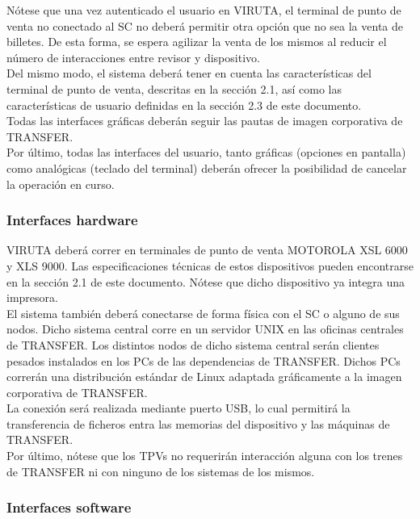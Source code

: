 Nótese que una vez autenticado el usuario en VIRUTA, el terminal de punto de venta no conectado al SC no deberá permitir otra opción que no sea la venta de billetes. De esta forma, se espera agilizar la venta de los mismos al reducir el número de interacciones entre revisor y dispositivo.\\

Del mismo modo, el sistema deberá tener en cuenta las características del terminal de punto de venta, descritas en la sección 2.1, así como las características de usuario definidas en la sección 2.3 de este documento.\\

Todas las interfaces gráficas deberán seguir las pautas de imagen corporativa de TRANSFER.\\

Por último, todas las interfaces del usuario, tanto gráficas (opciones en pantalla) como analógicas (teclado del terminal) deberán ofrecer la posibilidad de cancelar la operación en curso.\\

\subsubsection{Interfaces hardware}

VIRUTA deberá correr en terminales de punto de venta MOTOROLA XSL 6000 y XLS 9000. Las especificaciones técnicas de estos dispositivos pueden encontrarse en la sección 2.1 de este documento. Nótese que dicho dispositivo ya integra una impresora.\\

El sistema también deberá conectarse de forma física con el SC o alguno de sus nodos. Dicho sistema central corre en un servidor UNIX en las oficinas centrales de TRANSFER. Los distintos nodos de dicho sistema central serán clientes pesados instalados en los PCs de las dependencias de TRANSFER. Dichos PCs correrán una distribución estándar de Linux adaptada gráficamente a la imagen corporativa de TRANSFER.\\

La conexión será realizada mediante puerto USB, lo cual permitirá la transferencia de ficheros entra las memorias del dispositivo y las máquinas de TRANSFER.\\

Por último, nótese que los TPVs no requerirán interacción alguna con los trenes de TRANSFER ni con ninguno de los sistemas de los mismos.

\subsubsection{Interfaces software}

